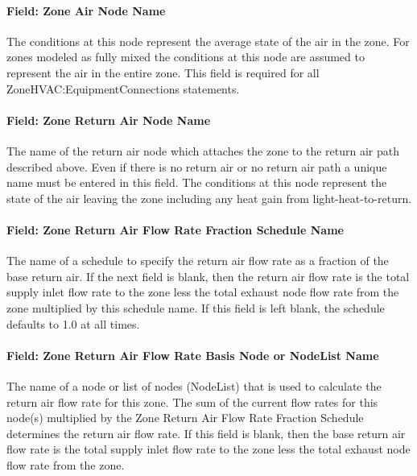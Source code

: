 \paragraph{Field: Zone Air Node Name}\label{field-zone-air-node-name}

The conditions at this node represent the average state of the air in the zone. For zones modeled as fully mixed the conditions at this node are assumed to represent the air in the entire zone. This field is required for all ZoneHVAC:EquipmentConnections statements.

\paragraph{Field: Zone Return Air Node Name}\label{field-zone-return-air-node-name}

The name of the return air node which attaches the zone to the return air path described above. Even if there is no return air or no return air path a unique name must be entered in this field. The conditions at this node represent the state of the air leaving the zone including any heat gain from light-heat-to-return.

\paragraph{Field: Zone Return Air Flow Rate Fraction Schedule Name}\label{field-zone-return-air-flow-rate-fraction-schedule-name}

The name of a schedule to specify the return air flow rate as a fraction of the base return air. If the next field is blank, then the return air flow rate is the total supply inlet flow rate to the zone less the total exhaust node flow rate from the zone multiplied by this schedule name. If this field is left blank, the schedule defaults to 1.0 at all times.

\paragraph{Field: Zone Return Air Flow Rate Basis Node or NodeList Name}\label{field-zone-return-air-flow-rate-basis-node-or-nodelist-name}

The name of a node or list of nodes (NodeList) that is used to calculate the return air flow rate for this zone. The sum of the current flow rates for this node(s) multiplied by the Zone Return Air Flow Rate Fraction Schedule determines the return air flow rate. If this field is blank, then the base return air flow rate is the total supply inlet flow rate to the zone less the total exhaust node flow rate from the zone.

